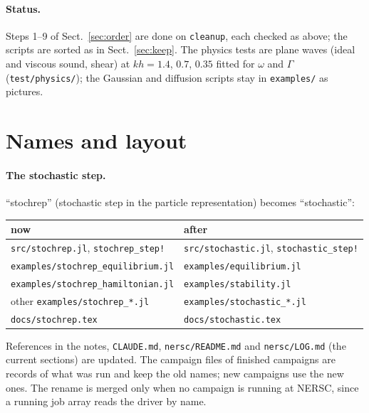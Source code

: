 \documentclass[11pt,aps,preprint,nofootinbib,superscriptaddress,tightenlines]{revtex4-2}
\def\Sect#1{Sect.~\ref{#1}}
\newcommand{\file}[1]{\texttt{#1}}
\let\oldparagraph\paragraph
\renewcommand{\paragraph}{\par\bigskip\oldparagraph}
\begin{document}
\paragraph{Status.}  Steps 1--9 of \Sect{sec:order} are done on \file{cleanup}, each checked as
above; the scripts are sorted as in \Sect{sec:keep}.  The physics tests are plane waves (ideal
and viscous sound, shear) at $kh=1.4$, $0.7$, $0.35$ fitted for $\omega$ and $\Gamma$
(\file{test/physics/}); the Gaussian and diffusion scripts stay in \file{examples/} as
pictures.

\section{Names and layout}
\label{sec:names}

\paragraph{The stochastic step.}  ``stochrep'' (stochastic step in the particle
representation) becomes ``stochastic'':
\begin{center}
\begin{tabular}{ll}
\hline
now & after \\ \hline
\file{src/stochrep.jl}, \file{stochrep\_step!} & \file{src/stochastic.jl}, \file{stochastic\_step!} \\
\file{examples/stochrep\_equilibrium.jl} & \file{examples/equilibrium.jl} \\
\file{examples/stochrep\_hamiltonian.jl} & \file{examples/stability.jl} \\
other \file{examples/stochrep\_*.jl} & \file{examples/stochastic\_*.jl} \\
\file{docs/stochrep.tex} & \file{docs/stochastic.tex} \\
\hline
\end{tabular}
\end{center}
References in the notes, \file{CLAUDE.md}, \file{nersc/README.md} and \file{nersc/LOG.md}
(the current sections) are updated.  The campaign files of finished campaigns are records of
what was run and keep the old names; new campaigns use the new ones.  The rename is merged
only when no campaign is running at NERSC, since a running job array reads the driver by
name.
\end{document}
